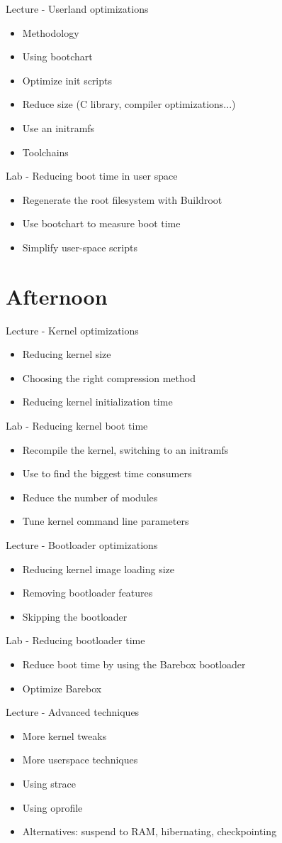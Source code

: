 \documentclass[a4paper,12pt,obeyspaces,spaces,hyphens]{article}
\begin{document}
\feagendatwocolumn
{Lecture - Userland optimizations}
{
  \begin{itemize}
  \item Methodology
  \item Using bootchart
  \item Optimize init scripts
  \item Reduce size (C library, compiler optimizations...)
  \item Use an initramfs
  \item Toolchains
  \end{itemize}
}
{Lab - Reducing boot time in user space}
{
 \begin{itemize}
 \item Regenerate the root filesystem with Buildroot
 \item Use bootchart to measure boot time
 \item Simplify user-space scripts
 \end{itemize}
}

\section{Afternoon}
\feagendatwocolumn
{Lecture - Kernel optimizations}
{
  \begin{itemize}
  \item Reducing kernel size
  \item Choosing the right compression method
  \item Reducing kernel initialization time
  \end{itemize}
}
{Lab - Reducing kernel boot time}
{
 \begin{itemize}
 \item Recompile the kernel, switching to an initramfs
 \item Use  to find the biggest 
       time consumers
 \item Reduce the number of modules
 \item Tune kernel command line parameters
 \end{itemize}
}

\feagendatwocolumn
{Lecture - Bootloader optimizations}
{
  \begin{itemize}
  \item Reducing kernel image loading size
  \item Removing bootloader features
  \item Skipping the bootloader
  \end{itemize}
}
{Lab - Reducing bootloader time}
{
 \begin{itemize}
 \item Reduce boot time by using the Barebox bootloader
 \item Optimize Barebox
 \end{itemize}
}

\feagendaonecolumn
{Lecture - Advanced techniques}
{
  \begin{itemize}
  \item More kernel tweaks
  \item More userspace techniques 
  \item Using strace
  \item Using oprofile
  \item Alternatives: suspend to RAM, hibernating, checkpointing
  \end{itemize}
}
\end{document}

